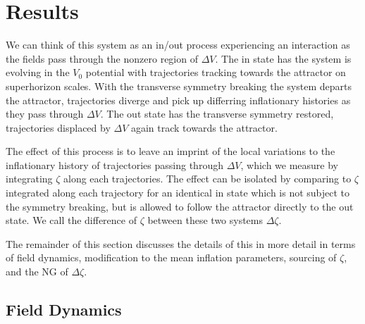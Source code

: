 
\section{Results} \label{sec:results}
We can think of this system as an in/out process experiencing an interaction as the fields pass through the nonzero region of $\Delta V$.
The in state has the system is evolving in the $V_0$ potential with trajectories tracking towards the attractor on superhorizon scales.
With the transverse symmetry breaking the system departs the attractor, trajectories diverge and pick up differring inflationary histories as they pass through $\Delta V$.
The out state has the transverse symmetry restored, trajectories displaced by $\Delta V$ again track towards the attractor.

The effect of this process is to leave an imprint of the local variations to the inflationary history of trajectories passing through $\Delta V$, which we measure by integrating $\zeta$ along each trajectories.
The effect can be isolated by comparing to $\zeta$ integrated along each trajectory for an identical in state which is not subject to the symmetry breaking, but is allowed to follow the attractor directly to the out state.
We call the difference of $\zeta$ between these two systems $\Delta \zeta$.

The remainder of this section discusses the details of this in more detail in terms of field dynamics, modification to the mean inflation parameters, sourcing of $\zeta$, and the NG of $\Delta\zeta$.

\subsection{Field Dynamics} \label{sec:field dynanics}

